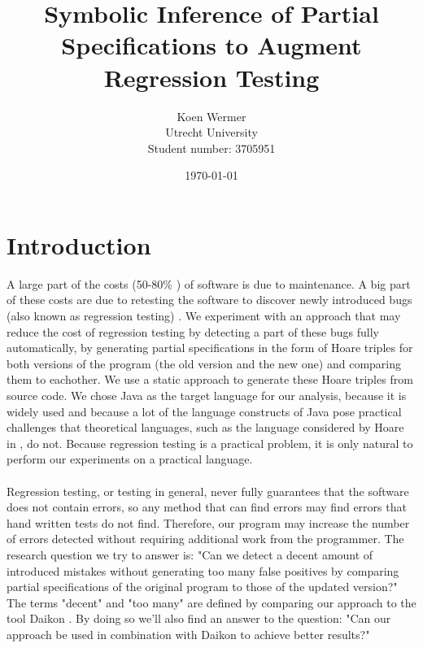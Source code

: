 \documentclass[a4paper, fleqn]{article}
\begin{document}
\lstset{language=Java} 

\title{Symbolic Inference of Partial Specifications to Augment Regression Testing}
\author{Koen Wermer\\
		Utrecht University \\
		Student number: 3705951}

\date{\today}
\maketitle
\clearpage

\section{Introduction}
A large part of the costs (50-80\%  \cite{costs}) of software is due to maintenance. A big part of these costs are due to retesting the software to discover newly introduced bugs (also known as regression testing) \cite{costs}. We experiment with an approach that may reduce the cost of regression testing by detecting a part of these bugs fully automatically, by generating partial specifications in the form of Hoare triples \cite{hoare} for both versions of the program (the old version and the new one) and comparing them to eachother. We use a static approach to generate these Hoare triples from source code. We chose Java as the target language for our analysis, because it is widely used and because a lot of the language constructs of Java pose practical challenges that theoretical languages, such as the language considered by Hoare in \cite{hoare}, do not. Because regression testing is a practical problem, it is only natural to perform our experiments on a practical language.
\\
\\
Regression testing, or testing in general, never fully guarantees that the software does not contain errors, so any method that can find errors may find errors that hand written tests do not find. Therefore, our program may increase the number of errors detected without requiring additional work from the programmer. The research question we try to answer is: "Can we detect a decent amount of introduced mistakes without generating too many false positives by comparing partial specifications of the original program to those of the updated version?" The terms "decent" and "too many" are defined by comparing our approach to the tool Daikon \cite{daikon}. By doing so we'll also find an answer to the question: "Can our approach be used in combination with Daikon to achieve better results?"
\end{document}
